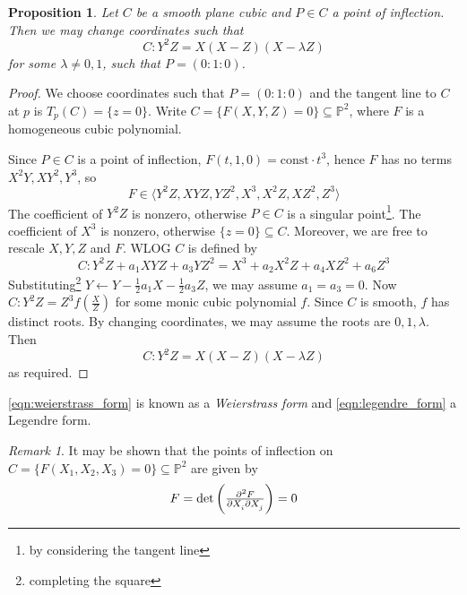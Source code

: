 \documentclass[11pt]{article}
\theoremstyle{definition}
\theoremstyle{plain}
\newtheorem{proposition}[definition]{Proposition}
\theoremstyle{remark}
\newtheorem*{remark*}{Remark}
\newcommand{\PP}{\mathbb{P}}
\begin{document}
\begin{proposition}\label{prop:2_7}
    Let $C$ be a smooth plane cubic and $P \in C$ a point of inflection. Then we may change coordinates such that
    \begin{equation*}
        C : Y^2 Z = X (X-Z) (X-\lambda Z)
    \end{equation*}
    for some $\lambda \neq 0, 1$, such that $P = (0:1:0)$.
\end{proposition}
\begin{proof}
    We choose coordinates such that $P = (0:1:0)$ and the tangent line to $C$ at $p$ is $T_p(C) = \{z=0\}$. Write $C = \{F(X,Y,Z) = 0\} \subseteq \PP^2$, where $F$ is a homogeneous cubic polynomial.

    Since $P \in C$ is a point of inflection, $F(t,1,0) = \text{const} \cdot t^3$, hence $F$ has no terms $X^2Y, XY^2, Y^3$, so
    \begin{equation*}
        F \in \langle Y^2Z, XYZ, YZ^2, X^3, X^2Z, XZ^2, Z^3 \rangle
    \end{equation*}
    The coefficient of $Y^2 Z$ is nonzero, otherwise $P \in C$ is a singular point\footnote{by considering the tangent line}. The coefficient of $X^3$ is nonzero, otherwise $\{z = 0\} \subseteq C$. Moreover, we are free to rescale $X,Y,Z$ and $F$. WLOG $C$ is defined by
    \begin{equation}\label{eqn:weierstrass_form}
        C : Y^2 Z + a_1 XYZ + a_3 Y Z^2 = X^3 + a_2 X^2 Z + a_4 X Z^2 + a_6 Z^3
    \end{equation}
    Substituting\footnote{completing the square} $Y \leftarrow Y - \frac{1}{2} a_1 X - \frac{1}{2} a_3 Z$, we may assume $a_1 = a_3 = 0$. Now $C : Y^2 Z = Z^3 f(\frac{X}{Z})$ for some monic cubic polynomial $f$. Since $C$ is smooth, $f$ has distinct roots. By changing coordinates, we may assume the roots are $0, 1, \lambda$. Then
    \begin{equation}\label{eqn:legendre_form}
        C : Y^2 Z = X(X-Z)(X-\lambda Z)
    \end{equation}
    as required.
\end{proof}
\noindent\eqref{eqn:weierstrass_form} is known as a \emph{Weierstrass form} and \eqref{eqn:legendre_form} a Legendre form.

\begin{remark*}
    It may be shown that the points of inflection on $C = \{F(X_1, X_2, X_3) = 0\} \subseteq \PP^2$ are given by
    \begin{equation*}
        F = \det \bigg(\md{F}{2}{X_i}{}{X_j}{}\bigg) = 0
    \end{equation*}
\end{remark*}
\end{document}
